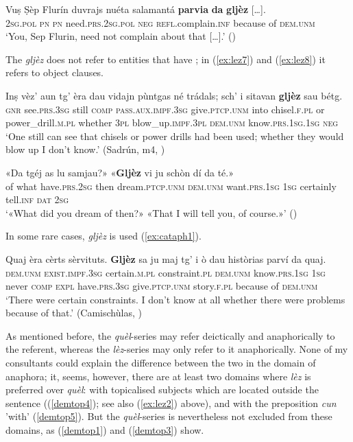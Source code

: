 \ea
\label{ex:lez6}
\gll Vuṣ Ṣèp Flurín duvrajs nuéta salamantá \textbf{parvia} \textbf{da} \textbf{gljèz} […].\\
\textsc{2sg.pol} \textsc{pn} \textsc{pn} need.\textsc{prs.2sg.pol} \textsc{neg} \textsc{refl.}complain.\textsc{inf} because of \textsc{dem.unm} \\
\glt `You, Sep Flurin, need not complain about that […].' (\citealt[91]{Gadola1935})
\z

The  \textit{gljèz} does not refer to entities that have ; in (\ref{ex:lez7}) and (\ref{ex:lez8}) it refers to object clauses.

\ea
\label{ex:lez7}
\gll Inṣ vèz’ aun tg’ èra dau vidajn pùntgas né trádals; sch’ i sitavan \textbf{gljèz} sau bétg.\\
\textsc{gnr} see.\textsc{prs.3sg} still \textsc{comp} \textsc{pass.aux.impf.3sg} give.\textsc{ptcp.unm} into chisel.\textsc{f.pl} or power\_drill.\textsc{m.pl} whether \textsc{3pl} blow\_up.\textsc{impf.3pl} \textsc{dem.unm} know.\textsc{prs.1sg.1sg} \textsc{neg}\\
\glt `One still can see that chisels or power drills had been used; whether they would blow up I don’t know.' (Sadrún, m4, )
\z

\ea
\label{ex:lez8}
\gll «Da tgéj as lu samjau?» «\textbf{Gljèz} vi ju schòn dí da té.»\\
of what have.\textsc{prs.2sg} then dream.\textsc{ptcp.unm} \textsc{dem.unm} want.\textsc{prs.1sg} \textsc{1sg} 
 certainly tell.\textsc{inf} \textsc{dat} \textsc{2sg}\\
\glt `«What did you dream of then?» «That I will tell you, of course.»' (\citealt[85]{Berther1998})
\z

In some rare cases, \textit{gljèz} is used  (\ref{ex:cataph1}).

\ea\label{ex:cataph1}
\gll  Quaj èra cèrts sèrvituts. \textbf{Gljèz} sa ju maj tg’ i ò dau històrias parví da quaj. \\
    \textsc{dem.unm} \textsc{exist.impf.3sg} certain.\textsc{m.pl} constraint.\textsc{pl} \textsc{dem.unm}  know.\textsc{prs.1sg} \textsc{1sg} never \textsc{comp} \textsc{expl} have.\textsc{prs.3sg} give.\textsc{ptcp.unm} story.\textsc{f.pl} because of \textsc{dem.unm} \\
\glt `There were certain constraints. I don’t know at all whether there were problems because of that.' (Camischùlas, )
\z

As mentioned before, the \textit{quèl}-series may refer deictically and anaphorically to the referent, whereas the \textit{lèz}-series may only refer to it anaphorically. None of my consultants could explain the difference between the two in the domain of anaphora; it, seems, however, there are at least two domains where \textit{lèz} is preferred over \textit{quèl}: with topicalised subjects which are located outside the sentence ((\ref{demtop4}); see also (\ref{ex:lez2}) above), and with the preposition \textit{cun} 'with' (\ref{demtop5}). But the \textit{quèl}-series is nevertheless not excluded from these domains, as (\ref{demtop1}) and (\ref{demtop3}) show.

